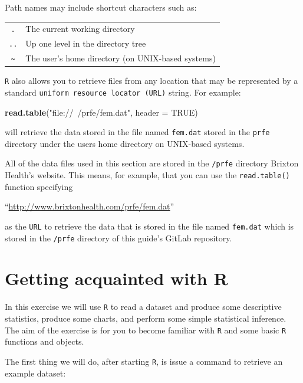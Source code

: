 \documentclass[]{book}
\newenvironment{Shaded}{\begin{snugshade}}{\end{snugshade}}
\newcommand{\KeywordTok}[1]{\textcolor[rgb]{0.13,0.29,0.53}{\textbf{#1}}}
\newcommand{\DataTypeTok}[1]{\textcolor[rgb]{0.13,0.29,0.53}{#1}}
\newcommand{\StringTok}[1]{\textcolor[rgb]{0.31,0.60,0.02}{#1}}
\newcommand{\OtherTok}[1]{\textcolor[rgb]{0.56,0.35,0.01}{#1}}
\newcommand{\NormalTok}[1]{#1}
\theoremstyle{definition}
\theoremstyle{definition}
\theoremstyle{definition}
\theoremstyle{remark}
\begin{document}
Path names may include shortcut characters such as:

\begin{longtable}[]{@{}cl@{}}
\toprule
\texttt{.} & The current working directory\tabularnewline
\texttt{..} & Up one level in the directory tree\tabularnewline
\texttt{\textasciitilde{}} & The user's home directory (on UNIX-based
systems)\tabularnewline
\bottomrule
\end{longtable}

\texttt{R} also allows you to retrieve files from any location that may
be represented by a standard \texttt{uniform\ resource\ locator\ (URL)}
string. For example:

\begin{Shaded}
\begin{Highlighting}[]
\KeywordTok{read.table}\NormalTok{(}\StringTok{"file://~/prfe/fem.dat"}\NormalTok{, }\DataTypeTok{header =} \OtherTok{TRUE}\NormalTok{)}
\end{Highlighting}
\end{Shaded}

will retrieve the data stored in the file named \texttt{fem.dat} stored
in the \texttt{prfe} directory under the users home directory on
UNIX-based systems.

All of the data files used in this section are stored in the
\texttt{/prfe} directory Brixton Health's website. This means, for
example, that you can use the \texttt{read.table()} function specifying

``\url{http://www.brixtonhealth.com/prfe/fem.dat}''

as the \texttt{URL} to retrieve the data that is stored in the file
named \texttt{fem.dat} which is stored in the \texttt{/prfe} directory
of this guide's GitLab repository.

\hypertarget{exercise1}{%
\chapter{Getting acquainted with R}\label{exercise1}}

In this exercise we will use \texttt{R} to read a dataset and produce
some descriptive statistics, produce some charts, and perform some
simple statistical inference. The aim of the exercise is for you to
become familiar with \texttt{R} and some basic \texttt{R} functions and
objects.

The first thing we will do, after starting \texttt{R}, is issue a
command to retrieve an example dataset:
\end{document}
